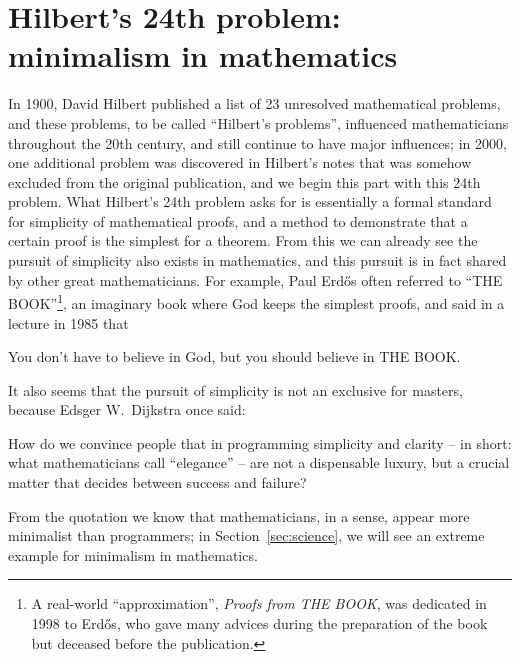 \newpart
\section{Hilbert's 24th problem: minimalism in mathematics}\label{sec:hilbert}

In 1900, David Hilbert published a list of 23 unresolved mathematical
problems, and these problems, to be called ``Hilbert's problems'', influenced
mathematicians throughout the 20th century, and still continue to have major
influences; in 2000, one additional problem was discovered in Hilbert's notes
that was somehow excluded from the original publication, and we begin this part
with this 24th problem.  What Hilbert's 24th problem
asks for is essentially a formal standard for simplicity of mathematical proofs,
and a method to demonstrate that a certain proof is the simplest for a theorem.
From this we can already see the pursuit of simplicity also exists in
mathematics, and this pursuit is in fact shared by other great mathematicians.
For example, Paul Erdős often referred to ``THE BOOK''\footnote{A real-world
``approximation'', \emph{Proofs from THE BOOK}, was
dedicated in 1998 to Erdős, who gave many advices during the preparation
of the book but deceased before the publication.}, an imaginary book where
God keeps the simplest proofs, and said in a lecture in 1985 that
\begin{quoting}
	You don't have to believe in God, but you should believe in THE BOOK.
\end{quoting}
It also seems that the pursuit of simplicity is not an exclusive
for masters, because Edsger W.\ Dijkstra once said:
\begin{quoting}
	How do we convince people that in programming simplicity and clarity --
	in short: what mathematicians call ``elegance'' -- are not a dispensable
	luxury, but a crucial matter that decides between success and failure?
\end{quoting}
From the quotation we know that mathematicians, in a sense, appear more
minimalist than programmers; in Section~\ref{sec:science}, we will
see an extreme example for minimalism in mathematics.

